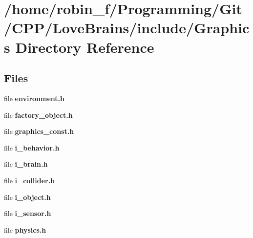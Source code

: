 \section{/home/robin\+\_\+f/\+Programming/\+Git/\+C\+P\+P/\+Love\+Brains/include/\+Graphics Directory Reference}
\label{dir_29f106c640635210cd7abac8c3672e87}
\subsection*{Files}
\begin{DoxyCompactItemize}
\item 
file {\bfseries environment.\+h}
\item 
file {\bfseries factory\+\_\+object.\+h}
\item 
file {\bfseries graphics\+\_\+const.\+h}
\item 
file {\bfseries i\+\_\+behavior.\+h}
\item 
file {\bfseries i\+\_\+brain.\+h}
\item 
file {\bfseries i\+\_\+collider.\+h}
\item 
file {\bfseries i\+\_\+object.\+h}
\item 
file {\bfseries i\+\_\+sensor.\+h}
\item 
file {\bfseries physics.\+h}
\end{DoxyCompactItemize}
